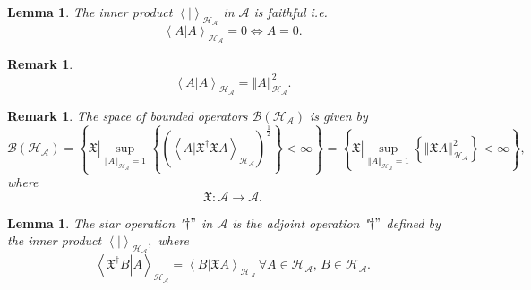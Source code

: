 \documentclass[aps,preprint]{revtex4}%
\newtheorem{lemma}[theorem]{Lemma}
\newtheorem{remark}[theorem]{Remark}
\begin{document}
\begin{lemma}
The inner product $\left\langle \left.  {}\right\vert \right\rangle
_{\mathcal{H}_{\mathcal{A}}}$ in $\mathcal{A}$ is faithful i.e.
\begin{equation}
\left\langle \left.  A\right\vert A\right\rangle _{\mathcal{H}_{\mathcal{A}}%
}=0\Leftrightarrow A=0.
\end{equation}

\end{lemma}

\begin{remark}%
\begin{equation}
\left\langle \left.  A\right\vert A\right\rangle _{\mathcal{H}_{\mathcal{A}}%
}=\left\Vert A\right\Vert _{\mathcal{H}_{\mathcal{A}}}^{2}.
\end{equation}

\end{remark}

\begin{remark}
The space of bounded operators $\mathcal{B}\left(  \mathcal{H}_{\mathcal{A}%
}\right)  $ is given by
\begin{equation}
\mathcal{B}\left(  \mathcal{H}_{\mathcal{A}}\right)  =\left\{  \left.
\overset{}{\mathfrak{X}}\right\vert \sup\limits_{\left\Vert A\right\Vert
_{\mathcal{H}_{\mathcal{A}}}=1}\left\{  \left(  \left\langle \left.
A\right\vert \mathfrak{X}^{\dagger}\mathfrak{X}A\right\rangle _{\mathcal{H}%
_{\mathcal{A}}}\right)  ^{\frac{1}{2}}\right\}  <\infty\right\}  =\left\{
\left.  \overset{}{\mathfrak{X}}\right\vert \sup\limits_{\left\Vert
A\right\Vert _{\mathcal{H}_{\mathcal{A}}}=1}\left\{  \left\Vert \mathfrak{X}%
A\right\Vert _{\mathcal{H}_{\mathcal{A}}}^{2}\right\}  <\infty\right\}  ,
\end{equation}
where
\begin{equation}
\mathfrak{X:}\mathcal{A\rightarrow A}.
\end{equation}

\end{remark}

\begin{lemma}
The star operation "$\dagger"$ in $\mathcal{A}$ is the adjoint operation
"$\dagger"$ defined by the inner product $\left\langle \left.  {}\right\vert
\right\rangle _{\mathcal{H}_{\mathcal{A}}},$ where%
\begin{equation}
\left\langle \left.  \mathfrak{X}^{\dagger}B\right\vert A\right\rangle
_{\mathcal{H}_{\mathcal{A}}}=\left\langle \left.  B\right\vert \mathfrak{X}%
A\right\rangle _{\mathcal{H}_{\mathcal{A}}}\,\forall A\in\mathcal{H}%
_{\mathcal{A}},\,B\in\mathcal{H}_{\mathcal{A}}.
\end{equation}

\end{lemma}
\end{document}
